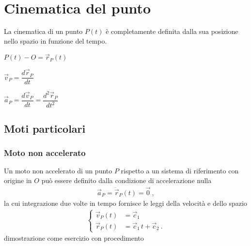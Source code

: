 \documentclass[letterpaper,10pt,italian]{jupyterBook}
\begin{document}
\sphinxstepscope


\section{Cinematica del punto}
\label{\detokenize{ch/mechanics/kinematics-point:cinematica-del-punto}}\label{\detokenize{ch/mechanics/kinematics-point:physics-hs-mechanics-kinematics-point}}\label{\detokenize{ch/mechanics/kinematics-point::doc}}
\sphinxAtStartPar
La cinematica di un punto \(P(t)\) è completamente definita dalla sua posizione nello spazio in funzione del tempo.

\sphinxAtStartPar
{} \(P(t) - O = \vec{r}_P(t)\)

\sphinxAtStartPar
{} \(\vec{v}_P = \dfrac{d \vec{r}_P}{dt}\)

\sphinxAtStartPar
{} \(\vec{a}_P = \dfrac{d \vec{v}_P}{dt} = \dfrac{d^2 \vec{r}_P}{d t^2}\)


\subsection{Moti particolari}
\label{\detokenize{ch/mechanics/kinematics-point:moti-particolari}}

\subsubsection{Moto non accelerato}
\label{\detokenize{ch/mechanics/kinematics-point:moto-non-accelerato}}
\sphinxAtStartPar
Un moto non accelerato di un punto \(P\) rispetto a un sistema di riferimento con origine in \(O\) può essere definito dalla condizione di accelerazione nulla
\begin{equation*}
\begin{split}\vec{a}_P = \ddot{\vec{r}}_P(t) = \vec{0} \ ,\end{split}
\end{equation*}
\sphinxAtStartPar
la cui integrazione due volte in tempo fornisce le leggi della velocità e dello spazio
\begin{equation*}
\begin{split}\begin{cases}
  \vec{v}_P(t) & = \vec{c}_1 \\
  \vec{r}_P(t) & = \vec{c}_1 \, t + \vec{c}_2 \ .
\end{cases}\end{split}
\end{equation*}
\sphinxAtStartPar
{} dimostrazione come esercizio con procedimento
\end{document}
